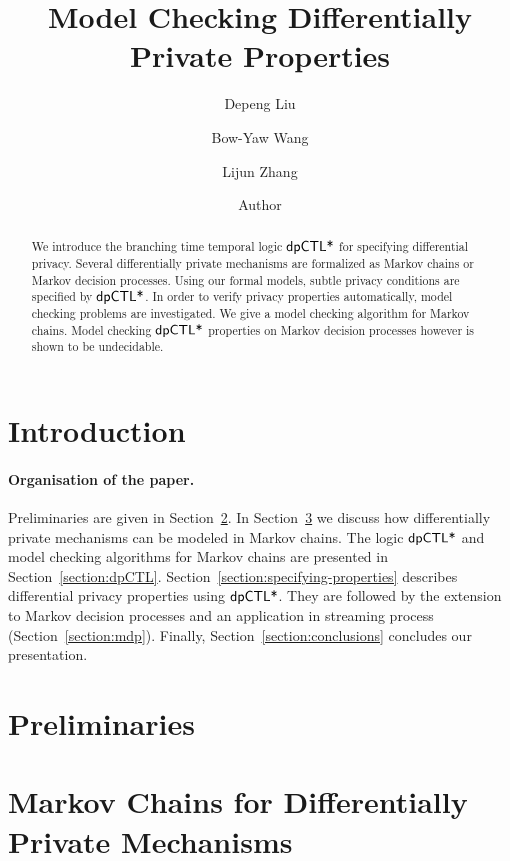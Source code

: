 \documentclass{llncs}
\title{Model Checking Differentially Private Properties}
\author{
Depeng Liu\inst{1}
\and
Bow-Yaw Wang\inst{2}
\and
Lijun Zhang\inst{1}}
\institute{
Chinese Academy of Sciences
\and
Academia Sinica
}
\author{Author}
\institute{Institute}
\begin{document}
\maketitle

\begin{abstract}
  We introduce the branching time temporal logic $\textsf{dpCTL*}$ for
  specifying differential privacy. Several differentially private
  mechanisms are formalized as Markov chains or Markov decision
  processes. Using our formal models, subtle privacy conditions
  are specified by $\textsf{dpCTL*}$. In order to verify privacy properties
  automatically, model checking problems are investigated.  We
  give a model checking algorithm for Markov chains. Model checking
  $\textsf{dpCTL*}$ properties on Markov decision processes however is
  shown to be undecidable.
\end{abstract}

\section{Introduction}
\label{section:introduction}


\paragraph{Organisation of the paper.}
Preliminaries are given in Section~\ref{section:preliminaries}.
In Section~\ref{section:examples} we discuss how differentially private mechanisms can be modeled in Markov chains.
The logic $\textsf{dpCTL*}$ and model checking algorithms for Markov chains are presented in
Section~\ref{section:dpCTL}.
Section~\ref{section:specifying-properties} describes differential privacy properties using   $\textsf{dpCTL*}$.
They are followed by the extension to Markov decision processes and an
application in streaming process (Section~\ref{section:mdp}). Finally,
Section~\ref{section:conclusions} concludes our presentation.

\section{Preliminaries}
\label{section:preliminaries}


\section{Markov Chains  for Differentially Private Mechanisms}
\label{section:examples}

\end{document}
